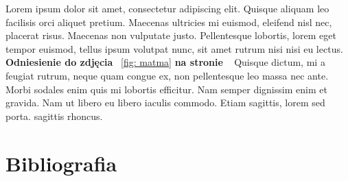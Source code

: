 \documentclass[12pt,a4paper]{article}
\begin{document}
	Lorem ipsum dolor sit amet, consectetur adipiscing elit. Quisque aliquam leo facilisis orci aliquet pretium. Maecenas ultricies mi euismod, eleifend nisl nec, placerat risus. Maecenas non vulputate justo.\cite{ref6} Pellentesque lobortis, lorem eget tempor euismod, tellus ipsum volutpat nunc, sit amet rutrum nisi nisi eu lectus.  \textbf{Odniesienie do zdjęcia} ~\ref{fig: matma} \textbf{na stronie} ~\pageref{fig: matma} Quisque dictum, mi a feugiat rutrum, neque quam congue ex, non pellentesque leo massa nec ante. Morbi sodales enim quis mi lobortis efficitur. Nam semper dignissim enim et gravida. Nam ut libero eu libero iaculis commodo. Etiam sagittis, lorem sed porta. sagittis rhoncus.
	
	\newpage
    \section{Bibliografia}
	\printbibliography
	
\end{document}
